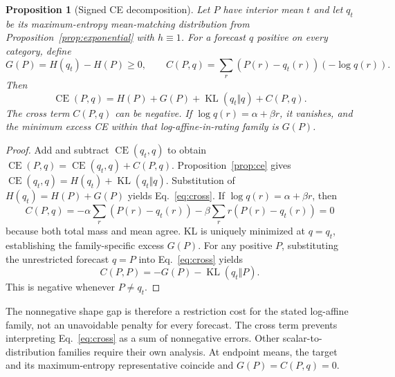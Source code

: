 \documentclass[11pt,letterpaper]{article}
\newtheorem{proposition}{Proposition}
\newcommand{\CE}{\operatorname{CE}}
\newcommand{\KL}{\operatorname{KL}}
\begin{document}
\begin{proposition}[Signed CE decomposition]\label{prop:cross}
Let $P$ have interior mean $t$ and let $q_t$ be its maximum-entropy mean-matching distribution from Proposition~\ref{prop:exponential} with $h\equiv1$.
For a forecast $q$ positive on every category, define
\[
 G(P)=H(q_t)-H(P)\ge0,\qquad
 C(P,q)=\sum_r(P(r)-q_t(r))(-\log q(r)).
\]
Then
\begin{equation}\label{eq:cross}
 \CE(P,q)=H(P)+G(P)+\KL(q_t\Vert q)+C(P,q).
\end{equation}
The cross term $C(P,q)$ can be negative.
If $\log q(r)=\alpha+\beta r$, it vanishes, and the minimum excess CE within that log-affine-in-rating family is $G(P)$.
\end{proposition}
\begin{proof}
Add and subtract $\CE(q_t,q)$ to obtain $\CE(P,q)=\CE(q_t,q)+C(P,q)$.
Proposition~\ref{prop:ce} gives $\CE(q_t,q)=H(q_t)+\KL(q_t\Vert q)$.
Substitution of $H(q_t)=H(P)+G(P)$ yields Eq.~\eqref{eq:cross}.
If $\log q(r)=\alpha+\beta r$, then
\[
 C(P,q)=-\alpha\sum_r(P(r)-q_t(r))-\beta\sum_r r(P(r)-q_t(r))=0
\]
because both total mass and mean agree.
KL is uniquely minimized at $q=q_t$, establishing the family-specific excess $G(P)$.
For any positive $P$, substituting the unrestricted forecast $q=P$ into Eq.~\eqref{eq:cross} yields
\[
 C(P,P)=-G(P)-\KL(q_t\Vert P).
\]
This is negative whenever $P\ne q_t$.
\end{proof}

The nonnegative shape gap is therefore a restriction cost for the stated log-affine family, not an unavoidable penalty for every forecast.
The cross term prevents interpreting Eq.~\eqref{eq:cross} as a sum of nonnegative errors.
Other scalar-to-distribution families require their own analysis.
At endpoint means, the target and its maximum-entropy representative coincide and $G(P)=C(P,q)=0$.
\end{document}
